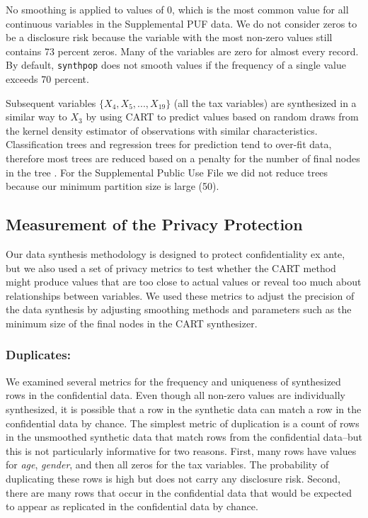 \documentclass[11pt,runningheads,oribibl]{llncs}
\begin{document}
No smoothing is applied to values of 0, which is the most common value for all continuous variables in the Supplemental PUF data. We do not consider zeros to be a disclosure risk because the variable with the most non-zero values still contains 73 percent zeros. Many of the variables are zero for almost every record. By default, \verb;synthpop; does not smooth values if the frequency of a single value exceeds 70 percent. 

Subsequent variables $\{X_4, X_5,..., X_19\}$ (all the tax variables) are synthesized in a similar way to $X_3$ by using CART to predict values based on random draws from the kernel density estimator of observations with similar characteristics. Classification trees and regression trees for prediction tend to over-fit data, therefore most trees are reduced based on a penalty for the number of final nodes in the tree \citep{kuhn2013applied}. For the Supplemental Public Use File we did not reduce trees because our minimum partition size is large (50).

\subsection{Measurement of the Privacy Protection}
Our data synthesis methodology is designed to protect confidentiality ex ante, but we also used a set of privacy metrics to test whether the CART method might produce values that are too close to actual values or reveal too much about relationships between variables. We used these metrics to adjust the precision of the data synthesis by adjusting smoothing methods and parameters such as the minimum size of the final nodes in the CART synthesizer. 

\subsubsection{Duplicates:} We examined several metrics for the frequency and uniqueness of synthesized rows in the confidential data. Even though all non-zero values are individually synthesized, it is possible that a row in the synthetic data can match a row in the confidential data by chance. The simplest metric of duplication is a count of rows in the unsmoothed synthetic data that match rows from the confidential data–but this is not particularly informative for two reasons. First, many rows have values for \textit{age}, \textit{gender}, and then all zeros for the tax variables. The probability of duplicating these rows is high but does not carry any disclosure risk. Second, there are many rows that occur in the confidential data that would be expected to appear as replicated in the confidential data by chance. 
\end{document}
